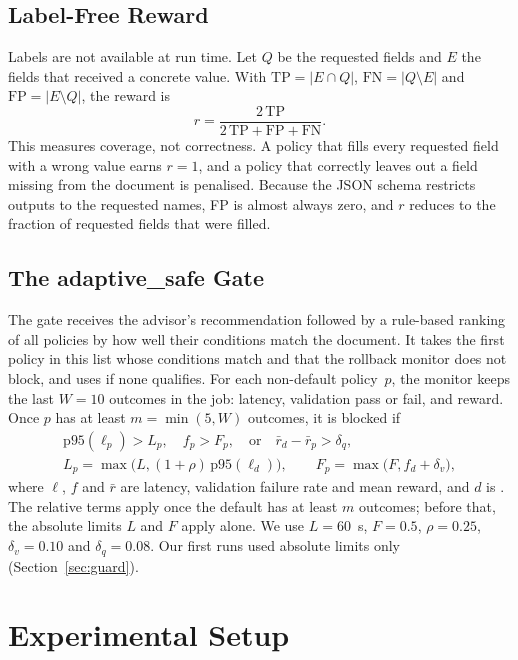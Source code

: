 \documentclass[conference,a4paper]{IEEEtran}
\newcommand{\pol}[1]{\texttt{\detokenize{#1}}}
\begin{document}
\subsection{Label-Free Reward}
Labels are not available at run time. Let $Q$ be the requested fields and $E$ the fields that received a concrete value. With $\mathrm{TP}=|E\cap Q|$, $\mathrm{FN}=|Q\setminus E|$ and $\mathrm{FP}=|E\setminus Q|$, the reward is
\begin{equation}
r = \frac{2\,\mathrm{TP}}{2\,\mathrm{TP}+\mathrm{FP}+\mathrm{FN}}.
\end{equation}
This measures coverage, not correctness. A policy that fills every requested field with a wrong value earns $r=1$, and a policy that correctly leaves out a field missing from the document is penalised. Because the JSON schema restricts outputs to the requested names, FP is almost always zero, and $r$ reduces to the fraction of requested fields that were filled.

\subsection{The adaptive\_safe Gate}
The gate receives the advisor's recommendation followed by a rule-based ranking of all policies by how well their conditions match the document. It takes the first policy in this list whose conditions match and that the rollback monitor does not block, and uses \pol{default} if none qualifies. For each non-default policy~$p$, the monitor keeps the last $W=10$ outcomes in the job: latency, validation pass or fail, and reward. Once $p$ has at least $m=\min(5,W)$ outcomes, it is blocked if
\begin{equation}
\begin{gathered}
\mathrm{p95}(\ell_p) > L_p, \quad f_p > F_p, \quad \text{or} \quad \bar r_{d} - \bar r_p > \delta_q, \\
L_p = \max\!\big(L, (1+\rho)\,\mathrm{p95}(\ell_d)\big), \qquad F_p = \max\!\big(F, f_d + \delta_v\big),
\end{gathered}
\end{equation}
where $\ell$, $f$ and $\bar r$ are latency, validation failure rate and mean reward, and $d$ is \pol{default}. The relative terms apply once the default has at least $m$ outcomes; before that, the absolute limits $L$ and $F$ apply alone. We use $L=60$~s, $F=0.5$, $\rho=0.25$, $\delta_v=0.10$ and $\delta_q=0.08$. Our first runs used absolute limits only (Section~\ref{sec:guard}).

\section{Experimental Setup}
\label{sec:setup}
\end{document}
